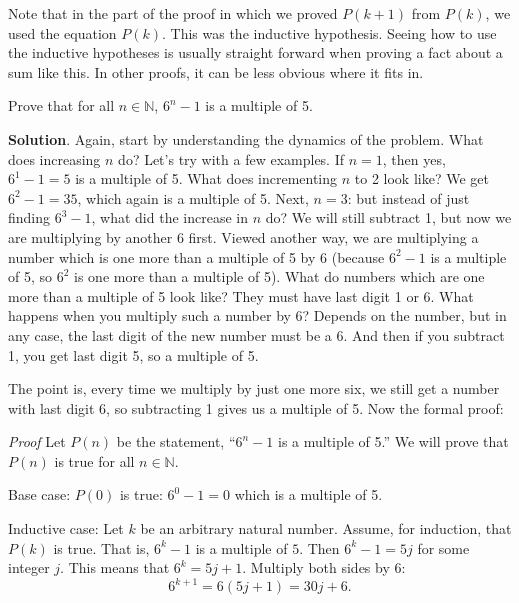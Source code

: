 \documentclass[11pt,]{book}
\makeatletter
\theoremstyle{ptxplainnotitle}
\theoremstyle{ptxplaintitle}
\renewcommand*{\proofname}{Proof}
\renewenvironment{proof}[1][\proofname]{\par
  \pushQED{\qed}%
  \normalfont \topsep6\p@\@plus6\p@\relax
  \trivlist
  \item\relax
    {\itshape
    #1\@addpunct{.}}\hspace\labelsep\ignorespaces
}{%
  \popQED\endtrivlist\@endpefalse
}
\theoremstyle{ptxdefinitionnotitle}
\theoremstyle{ptxdefinitiontitle}
\theoremstyle{ptxdefinitionnotitle}
\theoremstyle{ptxdefinitiontitle}
\theoremstyle{ptxdefinitionnotitle}
\theoremstyle{ptxdefinitiontitle}
\theoremstyle{ptxdefinitiontitlenonumber}
\theoremstyle{ptxdefinitiontitlenonumber}
\numberwithin{equation}{chapter}
\newcommand{\N}{\mathbb N}
\makeatother
\begin{document}
\hypertarget{p-575}{}%
Note that in the part of the proof in which we proved \(P(k+1)\) from \(P(k)\), we used the equation \(P(k)\). This was the inductive hypothesis. Seeing how to use the inductive hypotheses is usually straight forward when proving a fact about a sum like this. In other proofs, it can be less obvious where it fits in.%
\begin{example}\label{example-26}
\hypertarget{p-576}{}%
Prove that for all \(n \in \N\), \(6^n - 1\) is a multiple of 5.%
\par\smallskip%
\noindent\textbf{Solution}.\hypertarget{solution-78}{}\quad%
\hypertarget{p-577}{}%
Again, start by understanding the dynamics of the problem. What does increasing \(n\) do? Let's try with a few examples. If \(n = 1\), then yes, \(6^1 - 1 = 5\) is a multiple of 5. What does incrementing \(n\) to 2 look like? We get \(6^2 - 1 = 35\), which again is a multiple of 5. Next, \(n = 3\): but instead of just finding \(6^3 - 1\), what did the increase in \(n\) do? We will still subtract 1, but now we are multiplying by another 6 first. Viewed another way, we are multiplying a number which is one more than a multiple of 5 by 6 (because \(6^2 - 1\) is a multiple of 5, so \(6^2\) is one more than a multiple of 5). What do numbers which are one more than a multiple of 5 look like? They must have last digit 1 or 6. What happens when you multiply such a number by 6? Depends on the number, but in any case, the last digit of the new number must be a 6. And then if you subtract 1, you get last digit 5, so a multiple of 5.%
\par
\hypertarget{p-578}{}%
The point is, every time we multiply by just one more six, we still get a number with last digit 6, so subtracting 1 gives us a multiple of 5. Now the formal proof:%
\begin{proof}\hypertarget{proof-3}{}
\hypertarget{p-579}{}%
Let \(P(n)\) be the statement, ``\(6^n - 1\) is a multiple of 5.'' We will prove that \(P(n)\) is true for all \(n \in \N\).%
\par
\hypertarget{p-580}{}%
Base case: \(P(0)\) is true: \(6^0 -1 = 0\) which is a multiple of 5.%
\par
\hypertarget{p-581}{}%
Inductive case: Let \(k\) be an arbitrary natural number. Assume, for induction, that \(P(k)\) is true. That is, \(6^k - 1\) is a multiple of \(5\). Then \(6^k - 1 = 5j\) for some integer \(j\). This means that \(6^k = 5j + 1\). Multiply both sides by \(6\):%
\begin{equation*}
6^{k+1} = 6(5j+1) = 30j + 6.
\end{equation*}

\end{proof}
\end{example}
\end{document}
